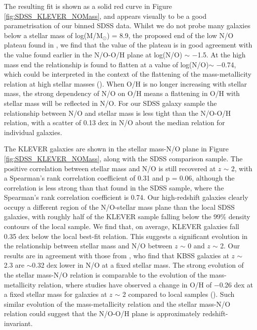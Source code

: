 \documentclass[usenatbib]{mnras} %
\begin{document}
The resulting fit is shown as a solid red curve in Figure \ref{fig:SDSS_KLEVER_NOMass}, and appears visually to be a good parametrisation of our binned SDSS data. Whilst we do not probe many galaxies below a stellar mass of log(M/M$_\odot$) = 8.9, the proposed end of the low N/O plateau found in \cite{AndrewsMartini_2013}, we find that the value of the plateau is in good agreement with the value found earlier in the N/O-O/H plane at log(N/O) $\sim$ $-$1.5. At the high mass end the relationship is found to flatten at a value of log(N/O)$\sim$ $-$0.74, which could be interpreted in the context of the flattening of the mass-metallicity relation at high stellar masses (\citealt{Tremonti_2004}). When O/H is no longer increasing with stellar mass, the strong dependency of N/O on O/H means a flattening in O/H with stellar mass will be reflected in N/O. For our SDSS galaxy sample the relationship between N/O and stellar mass is less tight than the N/O-O/H relation, with a scatter of 0.13 dex in N/O about the median relation for individual galaxies. 



The KLEVER galaxies are shown in the stellar mass-N/O plane in Figure \ref{fig:SDSS_KLEVER_NOMass}, along with the SDSS comparison sample. The positive correlation between stellar mass and N/O is still recovered at $z$ $\sim$ 2, with a Spearman's rank correlation coefficient of 0.31 and p = 0.06, although the correlation is less strong than that found in the SDSS sample, where the Spearman's rank correlation coefficient is 0.74. Our high-redshift galaxies clearly occupy a different region of the N/O-stellar mass plane than the local SDSS galaxies, with roughly half of the KLEVER sample falling below the 99\% density contours of the local sample. We find that, on average, KLEVER galaxies fall 0.35 dex below the local best-fit relation. This suggests a significant evolution in the relationship between stellar mass and N/O between $z$ $\sim$ 0 and $z$ $\sim$ 2. Our results are in agreement with those from \cite{Strom_2017}, who find that KBSS galaxies at $z$ $\sim$ 2.3 are $\sim$0.32 dex lower in N/O at a fixed stellar mass. The strong evolution of the stellar mass-N/O relation is comparable to the evolution of the mass-metallicity relation, where studies have observed a change in O/H of $-$0.26 dex at a fixed stellar mass for galaxies at $z$ $\sim$ 2 compared to local samples (\citealt{Sanders_2020FMR}). Such similar evolution of the mass-metallicity relation and the stellar mass-N/O relation could suggest that the N/O-O/H plane is approximately redshift-invariant.
\end{document}

